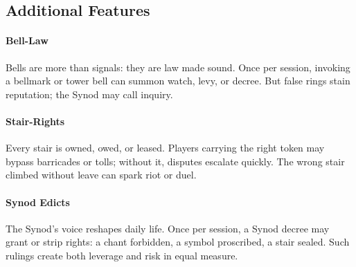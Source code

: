 \subsection*{Additional Features}
\label{sec:thepyrgos-features}

\paragraph{Bell-Law}
Bells are more than signals: they are law made sound. Once per session, invoking a bellmark or tower bell can summon watch, levy, or decree. But false rings stain reputation; the Synod may call inquiry.

\paragraph{Stair-Rights}
Every stair is owned, owed, or leased. Players carrying the right token may bypass barricades or tolls; without it, disputes escalate quickly. The wrong stair climbed without leave can spark riot or duel.

\paragraph{Synod Edicts}
The Synod’s voice reshapes daily life. Once per session, a Synod decree may grant or strip rights: a chant forbidden, a symbol proscribed, a stair sealed. Such rulings create both leverage and risk in equal measure.

